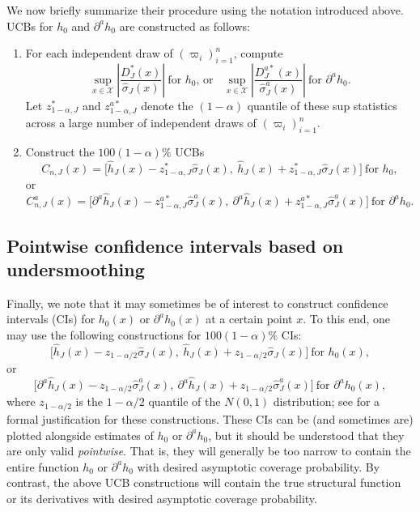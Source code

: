 \documentclass[
]{jss}
\begin{document}
We now briefly summarize their procedure using the notation introduced
above. UCBs for \(h_0\) and \(\partial^a h_0\) are constructed as
follows:

\begin{enumerate}
\item For each independent draw of $(\varpi_i)_{i=1}^n$, compute
\begin{equation} \label{eq:z_star-J-UCB}
 \sup_{x\in \mathcal{X}} \left| \frac{D_J^*(x)}{\hat \sigma_J(x)} \right|~\mbox{for $h_0$, or}~~~~\sup_{x \in \mathcal{X}} \left| \frac{D_J^{a*}(x)}{\hat \sigma_J^a(x)} \right|~\mbox{for $\partial^a h_0$}.
\end{equation}
Let $z_{1-\alpha,J}^*$ and $z_{1-\alpha,J}^{a*}$ denote the $(1-\alpha )$ quantile of
these sup statistics across a large number of independent draws of $(\varpi_i)_{i=1}^n$.
\item Construct the $100(1-\alpha)\%$ UCBs
\[
 C_{n,J}(x) = \bigg[ \hat{h}_{J}(x) -  z_{1-\alpha,J}^* \hat \sigma_{J}(x) , ~  \hat{h}_{J}(x) + z_{1-\alpha,J}^* \hat \sigma_{J}(x) \bigg] ~\mbox{for $h_0$},
\]
or
\[
 C_{n,J}^a(x) = \bigg[ \partial^a \hat{h}_{J}(x) - z_{1-\alpha,J}^{a*} \hat \sigma_{J}^a(x) ,~ \partial^a \hat{h}_{J}(x) +  z_{1-\alpha,J}^{a*} \hat \sigma_{J}^a(x) \bigg] ~\mbox{for $\partial^a h_0$}.
\]
\end{enumerate}

\hypertarget{pw}{%
\subsection{Pointwise confidence intervals based on
undersmoothing}\label{pw}}

Finally, we note that it may sometimes be of interest to construct
confidence intervals (CIs) for \(h_0(x)\) or \(\partial^a h_0(x)\) at a
certain point \(x\). To this end, one may use the following
constructions for \(100(1-\alpha)\%\) CIs: \[
 \bigg[ \hat{h}_{J}(x) -  z_{1-\alpha/2} \hat \sigma_{J}(x) , ~  \hat{h}_{J}(x) + z_{1-\alpha/2} \hat \sigma_{J}(x) \bigg] ~\mbox{for $h_0(x)$},
\] or \[
 \bigg[ \partial^a \hat{h}_{J}(x) - z_{1-\alpha/2} \hat \sigma_{J}^a(x) ,~ \partial^a \hat{h}_{J}(x) +  z_{1-\alpha/2} \hat \sigma_{J}^a(x) \bigg] ~\mbox{for $\partial^a h_0(x)$},
\] where \(z_{1-\alpha/2}\) is the \(1-\alpha/2\) quantile of the
\(N(0,1)\) distribution; see \citet{ChenPouzo} for a formal
justification for these constructions. These CIs can be (and sometimes
are) plotted alongside estimates of \(h_0\) or \(\partial^a h_0\), but
it should be understood that they are only valid \emph{pointwise}. That
is, they will generally be too narrow to contain the entire function
\(h_0\) or \(\partial^a h_0\) with desired asymptotic coverage
probability. By contrast, the above UCB constructions will contain the
true structural function or its derivatives with desired asymptotic
coverage probability.
\end{document}
